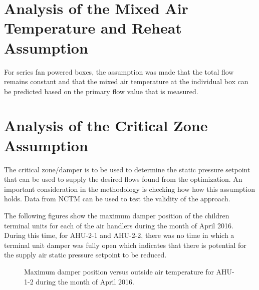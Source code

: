 \section{Analysis of the Mixed Air Temperature and Reheat Assumption}

For series fan powered boxes, the assumption was made that the total flow remains constant and that the mixed air temperature at the individual box can be predicted based on the primary flow value that is measured. 


\section{Analysis of the Critical Zone Assumption}

The critical zone/damper is to be used to determine the static pressure setpoint that can be used to supply the desired flows found from the optimization. An important consideration in the methodology is checking how how this assumption holds. Data from NCTM can be used to test the validity of the approach.


The following figures show the maximum damper position of the children terminal units for each of the air handlers during the month of April 2016. During this time, for AHU-2-1 and AHU-2-2, there was no time in which a terminal unit damper was fully open which indicates that there is potential for the supply air static pressure setpoint to be reduced.  




\begin{figure}
\centering
{}
\caption{Maximum damper position versus outside air temperature for AHU-1-2 during the month of April 2016.}
\label{fig:MaxDamperPositionforContainerAHU12vsOADryBulbTemperatureNOAA}
\end{figure}

